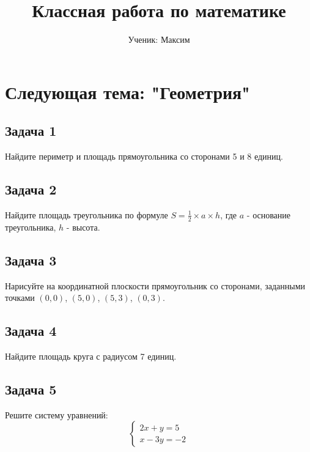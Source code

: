 \documentclass{article}
\begin{document}
\title{Классная работа по математике}
\author{Ученик: Максим}
\date{}
\maketitle

\section*{Следующая тема: "Геометрия"}

\subsection*{Задача 1}
Найдите периметр и площадь прямоугольника со сторонами 5 и 8 единиц.

\subsection*{Задача 2}
Найдите площадь треугольника по формуле $S = \frac{1}{2} \times a \times h$, где $a$ - основание треугольника, $h$ - высота.

\subsection*{Задача 3}
Нарисуйте на координатной плоскости прямоугольник со сторонами, заданными точками $(0,0)$, $(5,0)$, $(5,3)$, $(0,3)$.

\subsection*{Задача 4}
Найдите площадь круга с радиусом 7 единиц.

\subsection*{Задача 5}
Решите систему уравнений:
\[
\begin{cases}
2x + y = 5 \\
x - 3y = -2
\end{cases}
\]
\end{document}
